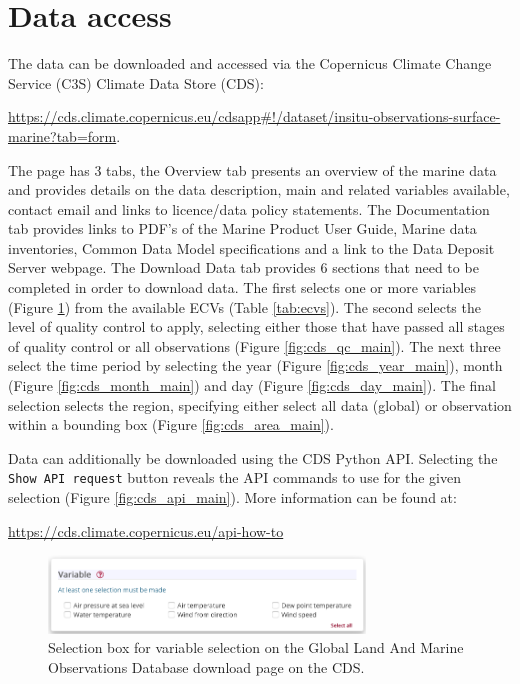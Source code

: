 \section{Data access}
The data can be downloaded and accessed via the Copernicus Climate Change Service (C3S) Climate Data Store (CDS):
\begin{center}
\sloppy\url{https://cds.climate.copernicus.eu/cdsapp#!/dataset/insitu-observations-surface-marine?tab=form}.
 \end{center}
The page has 3 tabs, the Overview tab presents an overview of the marine data and provides details on the data description, main and related variables available, contact email and links to licence/data policy statements. 
The Documentation tab provides links to PDF’s of the Marine Product User Guide, Marine data inventories, Common Data Model specifications and a link to the Data Deposit Server webpage. The Download Data tab provides 6 sections that need to be completed in order to download data. The first selects one or more variables (Figure \ref{fig:cds_variable_main}) from the available ECVs (Table \ref{tab:ecvs}). The second selects the level of quality control to apply, selecting either those that have passed all stages of quality control or all observations (Figure \ref{fig:cds_qc_main}). The next three select the time period  by selecting the year (Figure \ref{fig:cds_year_main}), month (Figure \ref{fig:cds_month_main}) and day (Figure \ref{fig:cds_day_main}). The final selection selects the region, specifying either select all data (global) or observation within a bounding box (Figure \ref{fig:cds_area_main}).

Data can additionally be downloaded using the CDS Python API. Selecting the \texttt{Show API request} button reveals the API commands to use for the given selection (Figure \ref{fig:cds_api_main}). More information can be found at:

\begin{center}
\url{https://cds.climate.copernicus.eu/api-how-to}
\end{center}

\begin{figure}[h]
\begin{center}
\includegraphics[width=0.75\textwidth]{resources/cds_variable_select.png}
\caption{Selection box for variable selection on the Global Land And Marine Observations Database download page on the CDS.\\}
\label{fig:cds_variable_main}
\end{center}
\end{figure}


